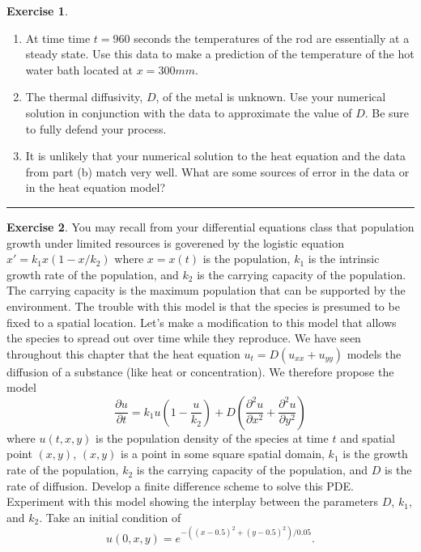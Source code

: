 \documentclass[
]{book}
\providecommand{\tightlist}{%
  \setlength{\itemsep}{0pt}\setlength{\parskip}{0pt}}
\theoremstyle{definition}
\theoremstyle{definition}
\theoremstyle{definition}
\newtheorem{exercise}{Exercise}[chapter]
\theoremstyle{remark}
\begin{document}
\begin{exercise}
\begin{enumerate}
\def\labelenumi{\alph{enumi}.}
\tightlist
\item
  At time time \(t=960\) seconds the temperatures of the rod are essentially at a steady state. Use this data to make a prediction of the temperature of the hot water bath located at \(x=300mm\).\\
\item
  The thermal diffusivity, \(D\), of the metal is unknown. Use your numerical solution in conjunction with the data to approximate the value of \(D\). Be sure to fully defend your process.
\item
  It is unlikely that your numerical solution to the heat equation and the data from part (b) match very well. What are some sources of error in the data or in the heat equation model?
\end{enumerate}
\end{exercise}

\begin{center}\rule{0.5\linewidth}{0.5pt}\end{center}

\begin{exercise}
\protect\hypertarget{exr:unnamed-chunk-620}{}{\label{exr:unnamed-chunk-620} }You may recall from your differential equations class that population growth under limited resources is goverened by the logistic equation \(x' = k_1x(1-x/k_2)\) where \(x=x(t)\) is the population, \(k_1\) is the intrinsic growth rate of the population, and \(k_2\) is the carrying capacity of the population. The carrying capacity is the maximum population that can be supported by the environment. The trouble with this model is that the species is presumed to be fixed to a spatial location. Let's make a modification to this model that allows the species to spread out over time while they reproduce. We have seen throughout this chapter that the heat equation \(u_t = D(u_{xx} + u_{yy})\) models the diffusion of a substance (like heat or concentration). We therefore propose the model\\
\[ \frac{\partial u}{\partial t} = k_1 u \left( 1 - \frac{u}{k_2} \right) + D \left( \frac{\partial^2 u}{\partial x^2} + \frac{\partial^2 u}{\partial y^2} \right)  \]
where \(u(t,x,y)\) is the population density of the species at time \(t\) and spatial point \((x,y)\), \((x,y)\) is a point in some square spatial domain, \(k_1\) is the growth rate of the population, \(k_2\) is the carrying capacity of the population, and \(D\) is the rate of diffusion. Develop a finite difference scheme to solve this PDE. Experiment with this model showing the interplay between the parameters \(D\), \(k_1\), and \(k_2\). Take an initial condition of
\[ u(0,x,y) = e^{-( (x-0.5)^2 + (y-0.5)^2)/0.05}. \]
\end{exercise}
\end{document}
